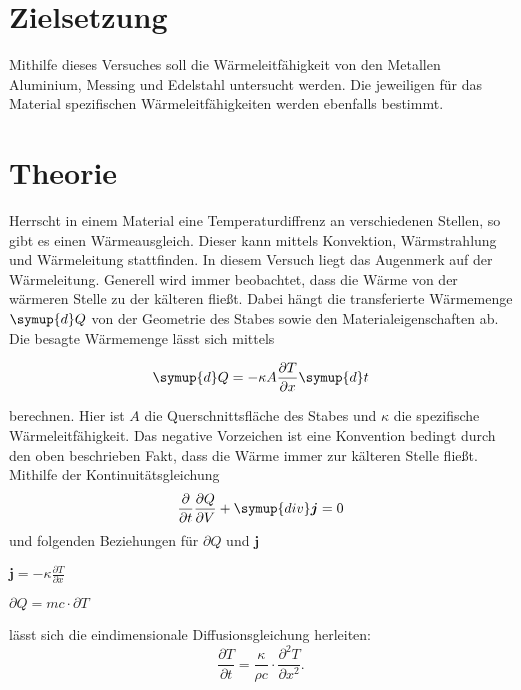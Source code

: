 \section{Zielsetzung}
Mithilfe dieses Versuches soll die Wärmeleitfähigkeit von den Metallen Aluminium, Messing und Edelstahl untersucht werden.
Die jeweiligen für das Material spezifischen Wärmeleitfähigkeiten werden ebenfalls bestimmt.


\section{Theorie}
\label{sec:Theorie}

Herrscht in einem Material eine Temperaturdiffrenz an verschiedenen Stellen, so gibt es einen Wärmeausgleich.
Dieser kann mittels Konvektion, Wärmstrahlung und Wärmeleitung stattfinden. In diesem Versuch liegt das Augenmerk auf der Wärmeleitung.
Generell wird immer beobachtet, dass die Wärme von der wärmeren Stelle zu der kälteren fließt.
Dabei hängt die transferierte Wärmemenge $\symup{d}Q$ von der Geometrie des Stabes sowie den Materialeigenschaften ab. Die besagte Wärmemenge lässt sich mittels

\begin{equation}
\label{eqn:waermemenge}
    \symup{d}Q = -\kappa A \frac{\partial T}{\partial x}\symup{d}t
\end{equation}

berechnen. Hier ist $A$ die Querschnittsfläche des Stabes und $\kappa$ die spezifische Wärmeleitfähigkeit. Das negative Vorzeichen ist eine Konvention bedingt durch den oben beschrieben Fakt, dass die Wärme immer zur kälteren Stelle fließt.
Mithilfe der Kontinuitätsgleichung 
\begin{equation}
\label{eqn:kontinuitaet}
    \frac{\partial}{\partial t}\frac{\partial Q}{\partial V} + \symup{div} \boldsymbol{j} = 0
\end{equation}
und folgenden Beziehungen für $\partial Q$ und $\boldsymbol{j}$

\centerline{$\boldsymbol{j} = - \kappa \frac{\partial T}{\partial x}$}

\centerline{$\partial Q = mc \cdot \partial T$}

lässt sich die eindimensionale Diffusionsgleichung herleiten:
\begin{equation}
\label{eqn:diffusion}
    \frac{\partial T}{\partial t} = \frac{\kappa}{\rho c} \cdot \frac{\partial^2 T}{\partial x^2}    .
\end{equation}

